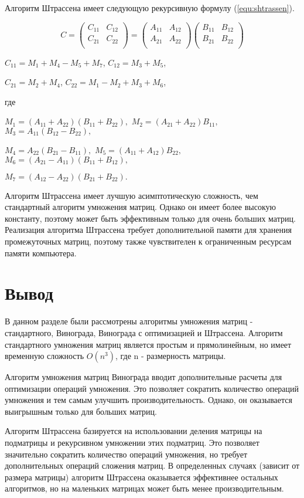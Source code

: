Алгоритм Штрассена имеет следующую рекурсивную формулу (\ref{equ:shtrassen}).


\begin{equation}
	\label{equ:shtrassen}
	C = \begin{pmatrix}
		C_{11} & C_{12} \\
		C_{21} & C_{22} \\
	\end{pmatrix} = \begin{pmatrix}
		A_{11} & A_{12} \\
		A_{21} & A_{22} \\
	\end{pmatrix}
	\begin{pmatrix}
		B_{11} & B_{12} \\
		B_{21} & B_{22} \\
	\end{pmatrix}
\end{equation}

$C_{11} = M_1 + M_4 - M_5 + M_7$, $C_{12} = M_3 + M_5$, 

$C_{21} = M_2 + M_4$, $C_{22} = M_1 - M_2 + M_3 + M_6$,

где

$M_1 = (A_{11} + A_{22})(B_{11} + B_{22}),$
$M_2 = (A_{21} + A_{22})B_{11},$
$M_3 = A_{11}(B_{12} - B_{22}),$

$M_4 = A_{22}(B_{21} - B_{11}),$
$M_5 = (A_{11} + A_{12})B_{22},$
$M_6 = (A_{21} - A_{11})(B_{11} + B_{12}),$

$M_7 = (A_{12} - A_{22})(B_{21} + B_{22}).$

Алгоритм Штрассена имеет лучшую асимптотическую сложность, чем стандартный алгоритм умножения матриц. Однако он имеет более высокую константу, поэтому может быть эффективным только для очень больших матриц. Реализация алгоритма Штрассена требует дополнительной памяти для хранения промежуточных матриц, поэтому также чувствителен к ограниченным ресурсам памяти компьютера.


\section{Вывод}
В данном разделе были рассмотрены алгоритмы умножения матриц - стандартного, Винограда, Винограда с оптимизацией и Штрассена.
Алгоритм стандартного умножения матриц является простым и прямолинейным, но имеет временную сложность $O(n^3)$, где n - размерность матрицы.

Алгоритм умножения матриц Винограда вводит дополнительные расчеты для оптимизации операций умножения. Это позволяет сократить количество операций умножения и тем самым улучшить производительность. Однако, он оказывается выигрышным только для больших матриц.

Алгоритм Штрассена базируется на использовании деления матрицы на подматрицы и рекурсивном умножении этих подматриц. Это позволяет значительно сократить количество операций умножения, но требует дополнительных операций сложения матриц. В определенных случаях (зависит от размера матрицы) алгоритм Штрассена оказывается эффективнее остальных алгоритмов, но на маленьких матрицах может быть менее производительным.

